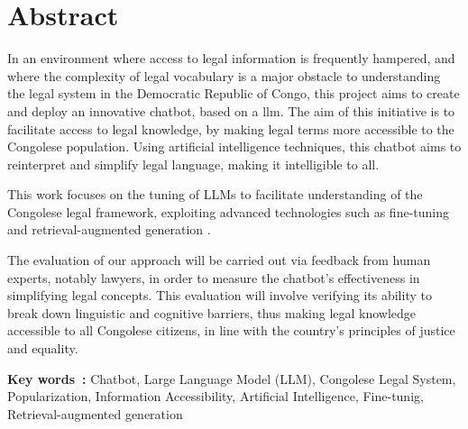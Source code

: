 \chapter*{Abstract}
In an environment where access to legal information is frequently hampered, and where the complexity of legal vocabulary is a major obstacle to understanding the legal system in the Democratic Republic of Congo, this project aims to create and deploy an innovative chatbot, based on a \ac{llm}. The aim of this initiative is to facilitate access to legal knowledge, by making legal terms more accessible to the Congolese population. Using artificial intelligence techniques, this chatbot aims to reinterpret and simplify legal language, making it intelligible to all.

This work focuses on the tuning of LLMs to facilitate understanding of the Congolese legal framework, exploiting advanced technologies such as fine-tuning and retrieval-augmented generation \cite{lewis2021retrievalaugmented}. 

The evaluation of our approach will be carried out via feedback from human experts, notably lawyers, in order to measure the chatbot's effectiveness in simplifying legal concepts. This evaluation will involve verifying its ability to break down linguistic and cognitive barriers, thus making legal knowledge accessible to all Congolese citizens, in line with the country's principles of justice and equality.

\vspace{1cm}
\textbf{Key words~:} Chatbot, Large Language Model (LLM), Congolese Legal System, Popularization, Information Accessibility, Artificial Intelligence, Fine-tunig, Retrieval-augmented generation


\endgroup			

\vfill
